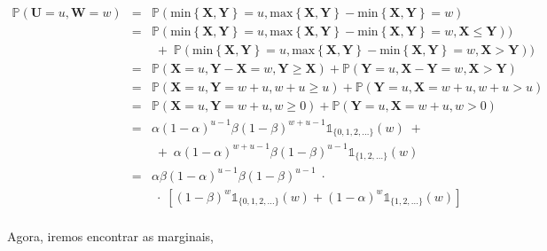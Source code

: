 \documentclass[a4paper, 11pt]{article}
\begin{document}
\begin{equation*}
\begin{array}{lclll}
\mathds{P}(\mathbf{U} = u, \mathbf{W} = w) & = &  \mathds{P}(\mathrm{min}\left\{ \mathbf{X}, \mathbf{Y} \right\} = u, \mathrm{max}\left\{ \mathbf{X}, \mathbf{Y} \right\} - \mathrm{min}\left\{ \mathbf{X}, \mathbf{Y} \right\} = w) \\
& = & \mathds{P}(\mathrm{min}\left\{ \mathbf{X}, \mathbf{Y} \right\} = u, \mathrm{max}\left\{ \mathbf{X}, \mathbf{Y} \right\} - \mathrm{min}\left\{ \mathbf{X}, \mathbf{Y} \right\} = w, \mathbf{X} \leq \mathbf{Y})) \\
&  & \; + \; \mathds{P}(\mathrm{min}\left\{ \mathbf{X}, \mathbf{Y} \right\} = u, \mathrm{max}\left\{ \mathbf{X}, \mathbf{Y} \right\} - \mathrm{min}\left\{ \mathbf{X}, \mathbf{Y} \right\} = w, \mathbf{X} > \mathbf{Y})) \\

& = & \mathds{P}(\mathbf{X} = u, \mathbf{Y} - \mathbf{X} = w, \mathbf{Y} \geq \mathbf{X}) + \mathds{P}(\mathbf{Y} = u, \mathbf{X} - \mathbf{Y} = w, \mathbf{X} > \mathbf{Y}) \\

& = & \mathds{P}(\mathbf{X} = u, \mathbf{Y} = w + u, w + u \geq u) + \mathds{P}(\mathbf{Y} = u, \mathbf{X} = w + u, w + u > u) \\

& = & \mathds{P}(\mathbf{X} = u, \mathbf{Y} = w + u, w \geq 0) + \mathds{P}(\mathbf{Y} = u, \mathbf{X} = w + u, w > 0) \\

& = & \alpha(1-\alpha)^{u-1}\beta(1-\beta)^{w+u-1}\mathds{1}_{\{0,1,2,\ldots\}}(w) \; + \; \\
&  & \; + \; \alpha(1-\alpha)^{w+u-1}\beta(1-\beta)^{u-1}\mathds{1}_{\{1,2,\ldots\}}(w) \\

& = & \alpha\beta(1-\alpha)^{u-1}\beta(1-\beta)^{u-1} \; \cdot \; \\ 
&  & \; \cdot \;  \left[(1-\beta)^{w} \mathds{1}_{\{0,1,2,\ldots\}}(w) + (1-\alpha)^{w} \mathds{1}_{\{1,2,\ldots\}}(w) \right] \\[10pt]

\end{array}
\end{equation*}

Agora, iremos encontrar as marginais,
\end{document}
